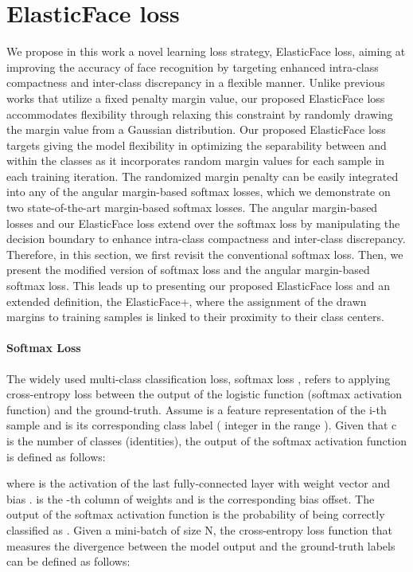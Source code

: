 \documentclass[letterpaper, 10 pt, conference]{ieeeconf}  \usepackage{times}
\begin{document}
\section{ElasticFace loss}
We propose in this work a novel learning loss strategy, ElasticFace loss, aiming at improving the accuracy of face recognition by targeting enhanced intra-class compactness and inter-class discrepancy in a flexible manner.
Unlike previous works \cite{deng2019arcface,DBLP:conf/cvpr/LiuWYLRS17,DBLP:conf/cvpr/WangWZJGZL018} that utilize a fixed penalty margin value, our proposed ElasticFace loss accommodates flexibility through relaxing this constraint by randomly drawing the margin value from a Gaussian distribution. 
Our proposed ElasticFace loss targets giving the model flexibility in optimizing the separability between and within the classes as it incorporates random margin values for each sample in each training iteration. 
The randomized margin penalty can be easily integrated into any of the angular margin-based softmax losses, which we demonstrate on two state-of-the-art margin-based softmax losses.
The angular margin-based losses and our ElasticFace loss extend over the softmax loss by manipulating the decision boundary to enhance intra-class compactness and inter-class discrepancy.
Therefore, in this section, we first revisit the conventional softmax loss.  Then, we present the modified version of softmax loss and the angular margin-based softmax loss. This leads up to presenting our proposed ElasticFace loss and an extended definition, the ElasticFace+, where the assignment of the drawn margins to training samples is linked to their proximity to their class centers.






\paragraph{Softmax Loss}
The widely used multi-class classification loss, softmax loss \cite{DBLP:conf/icml/LiuWYY16}, refers to applying cross-entropy loss between the output of the logistic function (softmax activation function) and the ground-truth.
Assume {} is a feature representation of the {i-th} sample {} and {} is its corresponding class label ( integer in the range ). Given that {c} is the number of classes (identities),
the output of the softmax activation function is defined as follows:

where  is the activation of the last fully-connected layer with weight vector  and bias .
 is the -th column of weights  and  is the corresponding bias offset. The output of the softmax activation function is the probability of  being correctly classified as . Given a mini-batch of size N, the cross-entropy loss function that measures the  divergence between the model output and the ground-truth labels can be defined as follows:
\end{document}
